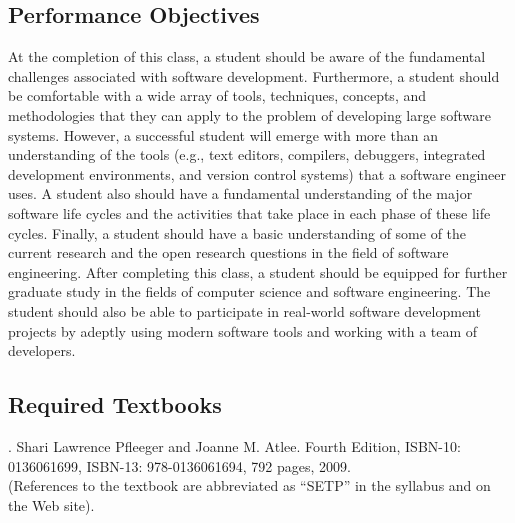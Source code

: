\subsection*{Performance Objectives}

At the completion of this class, a student should be aware of the fundamental challenges associated with software
development.  Furthermore, a student should be comfortable with a wide array of tools, techniques, concepts, and
methodologies that they can apply to the problem of developing large software systems.  However, a successful student
will emerge with more than an understanding of the tools (e.g., text editors, compilers, debuggers, integrated
development environments, and version control systems) that a software engineer uses.  A student also should have a
fundamental understanding of the major software life cycles and the activities that take place in each phase of these
life cycles.  Finally, a student should have a basic understanding of some of the current research and the open research
questions in the field of software engineering.  After completing this class, a student should be equipped for further
graduate study in the fields of computer science and software engineering.  The student should also be able to
participate in real-world software development projects by adeptly using modern software tools and working with a team of
developers.

\subsection*{Required Textbooks}


. Shari Lawrence Pfleeger and Joanne M. Atlee.
Fourth Edition, ISBN-10: 0136061699, ISBN-13: 978-0136061694, 792 pages, 2009. \\
(References to the textbook are abbreviated as ``SETP'' in the syllabus and on the Web site).


